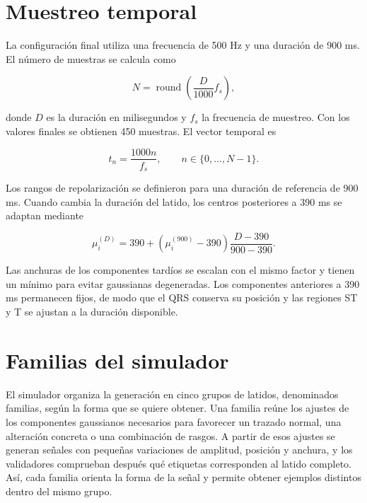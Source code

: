\section{Muestreo temporal}

La configuración final utiliza una frecuencia de 500 Hz y una duración de 900 ms. El número de muestras se calcula como

\begin{equation}
N =
\operatorname{round}
\left(
\frac{D}{1000}f_s
\right),
\end{equation}

donde \(D\) es la duración en milisegundos y \(f_s\) la frecuencia de muestreo. Con los valores finales se obtienen 450 muestras. El vector temporal es

\begin{equation}
t_n =
\frac{1000n}{f_s},
\qquad
n \in \{0,\ldots,N-1\}.
\end{equation}

Los rangos de repolarización se definieron para una duración de referencia de 900 ms. Cuando cambia la duración del latido, los centros posteriores a 390 ms se adaptan mediante

\begin{equation}
\mu_i^{(D)} =
390 +
\left(
\mu_i^{(900)}-390
\right)
\frac{D-390}{900-390}.
\label{eq:time_scaling}
\end{equation}

Las anchuras de los componentes tardíos se escalan con el mismo factor y tienen un mínimo para evitar gaussianas degeneradas. Los componentes anteriores a 390 ms permanecen fijos, de modo que el QRS conserva su posición y las regiones ST y T se ajustan a la duración disponible.

\section{Familias del simulador}

El simulador organiza la generación en cinco grupos de latidos, denominados familias, según la forma que se quiere obtener. Una familia reúne los ajustes de los componentes gaussianos necesarios para favorecer un trazado normal, una alteración concreta o una combinación de rasgos. A partir de esos ajustes se generan señales con pequeñas variaciones de amplitud, posición y anchura, y los validadores comprueban después qué etiquetas corresponden al latido completo. Así, cada familia orienta la forma de la señal y permite obtener ejemplos distintos dentro del mismo grupo.

